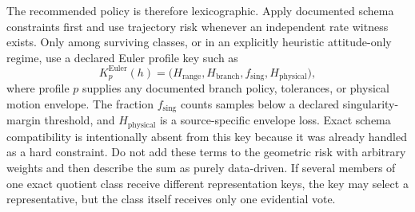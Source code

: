 \documentclass[11pt]{article}
\begin{document}
    The recommended policy is therefore lexicographic. Apply documented schema constraints
    first and use trajectory risk whenever an independent rate witness exists. Only among
    surviving classes, or in an explicitly heuristic attitude-only regime, use a declared
    Euler profile key such as
    \begin{equation}
        K_p^{\mathrm{Euler}}(h)
        =\bigl(
        H_{\mathrm{range}},
        H_{\mathrm{branch}},
        f_{\mathrm{sing}},
        H_{\mathrm{physical}}
        \bigr),
        \label{eq:euler-heuristic-key}
    \end{equation}
    where profile $p$ supplies any documented branch policy, tolerances, or physical motion
    envelope. The fraction $f_{\mathrm{sing}}$ counts samples below a declared singularity-
    margin threshold, and $H_{\mathrm{physical}}$ is a source-specific envelope loss. Exact
    schema compatibility is intentionally absent from this key because it was already
    handled as a hard constraint. Do not add these terms to the geometric risk with
    arbitrary weights and then describe the sum as purely data-driven. If several members
    of one exact quotient class receive different representation keys, the key may select a
    representative, but the class itself receives only one evidential vote.
\end{document}

